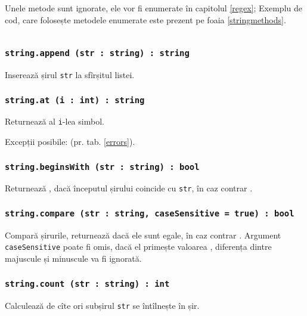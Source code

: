 Unele metode sunt ignorate, ele vor fi enumerate în capitolul \ref{regex}; Exemplu de cod, care folosește metodele enumerate este prezent pe foaia \ref{stringmethods}.

\begin{sourcecode}
    \label{stringmethods}
    \inputminted[linenos]{icl}{../sources/stringmethods.icL}
\end{sourcecode}

\subsubsection{\texttt{string.append (str : string) : string}}

Inserează șirul \texttt{str} la sfîrșitul listei.

\subsubsection{\texttt{string.at (i : int) : string}}

Returnează al \texttt{i}-lea simbol.

Excepții posibile:  (pr. tab. \ref{errors}).

\subsubsection{\texttt{string.beginsWith (str : string) : bool}}

Returnează \true{}, dacă începutul șirului coincide cu \texttt{str}, în caz contrar \false{}.

\subsubsection{\texttt{string.compare (str : string, caseSensitive = true) : bool}}

Compară șirurile, returnează \true{} dacă ele sunt egale, în caz contrar \false{}. Argument \texttt{caseSensitive} poate fi omis, dacă el primește valoarea \false{}, diferența dintre majuscule și minuscule va fi ignorată.

\subsubsection{\texttt{string.count (str : string) : int}}

Calculează de cîte ori subșirul \texttt{str} se întîlnește în șir.

